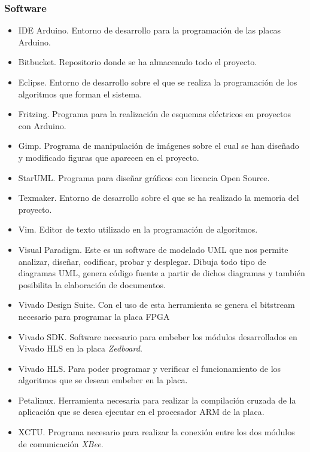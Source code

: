 \subsubsection{Software}
\begin{itemize}
\item \ac{IDE} Arduino. Entorno de desarrollo para la programación de las placas Arduino.
\item Bitbucket. Repositorio donde se ha almacenado todo el proyecto.
\item Eclipse. Entorno de desarrollo sobre el que se realiza la programación de los algoritmos que forman el sistema.
\item Fritzing. Programa para la realización de esquemas eléctricos en proyectos con Arduino.
\item Gimp. Programa de manipulación de imágenes sobre el cual se han diseñado y modificado figuras que aparecen en el proyecto.
\item StarUML. Programa para diseñar gráficos  con licencia Open Source.
\item Texmaker. Entorno de desarrollo sobre el que se ha realizado la memoria del proyecto.
\item Vim. Editor de texto utilizado en la programación de algoritmos.
\item Visual Paradigm. Este es un software de modelado \ac{UML} que nos permite analizar, diseñar, codificar, probar y desplegar. Dibuja todo tipo de diagramas \ac{UML}, genera código fuente a partir de dichos diagramas y también posibilita la elaboración de documentos. 
\item Vivado Design Suite. Con el uso de esta herramienta se genera el bitstream necesario para programar la placa \ac{FPGA}
\item Vivado \ac{SDK}. Software necesario para embeber los módulos  desarrollados en Vivado \ac{HLS} en la placa \emph{Zedboard}.
\item Vivado \ac{HLS}. Para poder programar y verificar el funcionamiento de los algoritmos que se desean embeber en la placa.
\item Petalinux. Herramienta necesaria para realizar la compilación cruzada de la aplicación que se desea ejecutar en el procesador \ac{ARM} de la placa.
\item XCTU. Programa necesario para realizar la conexión entre los dos módulos de comunicación \emph{XBee}.
\end{itemize}
